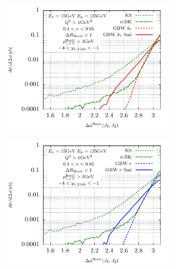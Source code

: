 \documentclass[11pt]{article}
\begin{document}
\begin{figure}[p]
	\begin{subfigure}{0.5\textwidth}
		\includegraphics[width=\textwidth]{plots/plotGBW2Jets}
	\end{subfigure}
	\begin{subfigure}{0.5\textwidth}
		\includegraphics[width=\textwidth]{plots/plotGBW3Jets}
	\end{subfigure}


\end{figure}
\end{document}
